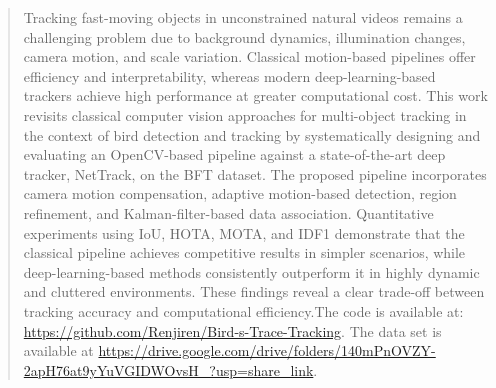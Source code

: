 \begin{abstract}

Tracking fast-moving objects in unconstrained natural videos remains a challenging problem due to background dynamics, illumination changes, camera motion, and scale variation. Classical motion-based pipelines offer efficiency and interpretability, whereas modern deep-learning-based trackers achieve high performance at greater computational cost. This work revisits classical computer vision approaches for multi-object tracking in the context of bird detection and tracking by systematically designing and evaluating an OpenCV-based pipeline against a state-of-the-art deep tracker, NetTrack, on the BFT dataset. The proposed pipeline incorporates camera motion compensation, adaptive motion-based detection, region refinement, and Kalman-filter-based data association. Quantitative experiments using IoU, HOTA, MOTA, and IDF1 demonstrate that the classical pipeline achieves competitive results in simpler scenarios, while deep-learning-based methods consistently outperform it in highly dynamic and cluttered environments. These findings reveal a clear trade-off between tracking accuracy and computational efficiency.The code is available at: \url{https://github.com/Renjiren/Bird-s-Trace-Tracking}. The data set is available at \url{https://drive.google.com/drive/folders/140mPnOVZY-2apH76at9yYuVGIDWOvsH_?usp=share_link}.

\end{abstract}